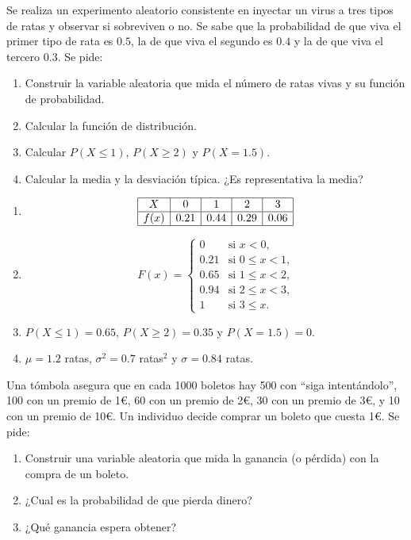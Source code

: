 {Se realiza un experimento aleatorio consistente en inyectar un virus a tres tipos de ratas y observar si sobreviven o
no.
Se sabe que la probabilidad de que viva el primer tipo de rata es $0.5$, la de que viva el segundo es $0.4$ y la de
que viva el tercero $0.3$.
Se pide:
\begin{enumerate}
\item Construir la variable aleatoria que mida el número de ratas vivas y su función de probabilidad.
\item Calcular la función de distribución.
\item Calcular $P(X\leq 1)$, $P(X\geq 2)$ y $P(X=1.5)$.
\item Calcular la media y la desviación típica. ¿Es representativa la media?
\end{enumerate}
}
{
\begin{enumerate}
\item \[
\begin{array}{|c|c|c|c|c|}
\hline
X & 0 & 1 & 2 & 3 \\
\hline
f(x) & 0.21 & 0.44 & 0.29 & 0.06\\
\hline
\end{array}
\]
\item \[
F(x)=
\begin{cases}
0 & \text{si $x<0$,}\\
0.21 & \text{si $0\leq x<1$,}\\
0.65 & \text{si $1\leq x<2$,}\\
0.94 & \text{si $2\leq x<3$,}\\
1 & \text{si $3\leq x$.}
\end{cases}
\]
\item $P(X\leq 1)=0.65$, $P(X\geq 2)=0.35$ y $P(X=1.5)=0$.
\item $\mu=1.2$ ratas, $\sigma^2=0.7$ ratas$^2$ y $\sigma=0.84$ ratas.
\end{enumerate}
}
{}


{Una tómbola asegura que en cada 1000 boletos hay 500 con ``siga intentándolo'', 100 con un premio de 1\euro, 60 con un premio de 2\euro, 30 con un premio de 3\euro, y 10 con un premio de 10\euro. Un individuo decide comprar un boleto que cuesta 1\euro. Se pide:

\begin{enumerate}
\item Construir una variable aleatoria que mida la ganancia (o pérdida) con la compra de un boleto.
\item ¿Cual es la probabilidad de que pierda dinero?
\item ¿Qué ganancia espera obtener?
\end{enumerate}
}
{}
{}


